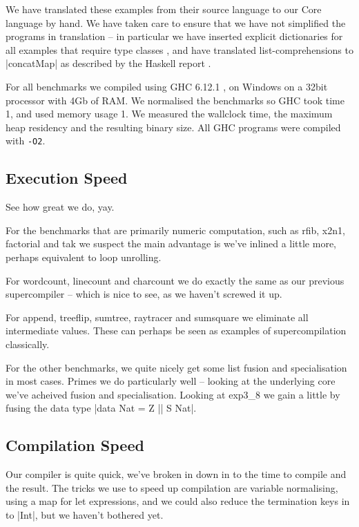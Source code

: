 \documentclass[draft]{sigplanconf}
\begin{document}
We have translated these examples from their source language to our Core language by hand. We have taken care to ensure that we have not simplified the programs in translation -- in particular we have inserted explicit dictionaries for all examples that require type classes \cite{wadler:typeclasses}, and have translated list-comprehensions to |concatMap| as described by the Haskell report \cite{haskell}.

For all benchmarks we compiled using GHC 6.12.1 \cite{ghc_6_12_1}, on Windows on a 32bit processor with 4Gb of RAM. We normalised the benchmarks so GHC took time 1, and used memory usage 1. We measured the wallclock time, the maximum heap residency and the resulting binary size. All GHC programs were compiled with \texttt{-O2}.


\subsection{Execution Speed}

See how great we do, yay.

For the benchmarks that are primarily numeric computation, such as rfib, x2n1, factorial and tak we suspect the main advantage is we've inlined a little more, perhaps equivalent to loop unrolling.

For wordcount, linecount and charcount we do exactly the same as our previous supercompiler -- which is nice to see, as we haven't screwed it up.

For append, treeflip, sumtree, raytracer and sumsquare we eliminate all intermediate values. These can perhaps be seen as examples of supercompilation classically.

For the other benchmarks, we quite nicely get some list fusion and specialisation in most cases. Primes we do particularly well -- looking at the underlying core we've acheived fusion and specialisation. Looking at exp3\_8 we gain a little by fusing the data type |data Nat = Z || S Nat|.

\subsection{Compilation Speed}

Our compiler is quite quick, we've broken in down in to the time to compile and the result. The tricks we use to speed up compilation are variable normalising, using a map for let expressions, and we could also reduce the termination keys in to |Int|, but we haven't bothered yet.
\end{document}
